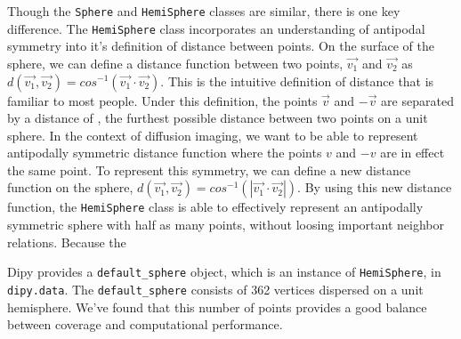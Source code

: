 Though the \verb|Sphere| and \verb|HemiSphere| classes are similar, there is one key difference. The \verb|HemiSphere| class incorporates an understanding of antipodal symmetry into it's definition of distance between points. On the surface of the sphere, we can define a distance function between two points, $\vec{v_1}$ and $\vec{v_2}$ as $d(\vec{v_1}, \vec{v_2}) = cos^{-1}(\vec{v_1} \cdot \vec{v_2})$. This is the intuitive definition of distance that is familiar to most people. Under this definition, the points $\vec{v}$ and $-\vec{v}$ are separated by a distance of \pi, the furthest possible distance between two points on a unit sphere. In the context of diffusion imaging, we want to be able to represent antipodally symmetric distance function where the points $v$ and $-v$ are in effect the same point. To represent this symmetry, we can define a new distance function on the sphere, $d(\vec{v_1}, \vec{v_2}) = cos^{-1}(|\vec{v_1} \cdot \vec{v_2}|)$. By using this new distance function, the \verb|HemiSphere| class is able to effectively represent an antipodally symmetric sphere with half as many points, without loosing important neighbor relations. Because the 

Dipy provides a \verb|default_sphere| object, which is an instance of \verb|HemiSphere|, in \verb|dipy.data|. The \verb|default_sphere| consists of 362 vertices dispersed on a unit hemisphere. We've found that this number of points provides a good balance between coverage and computational performance.
